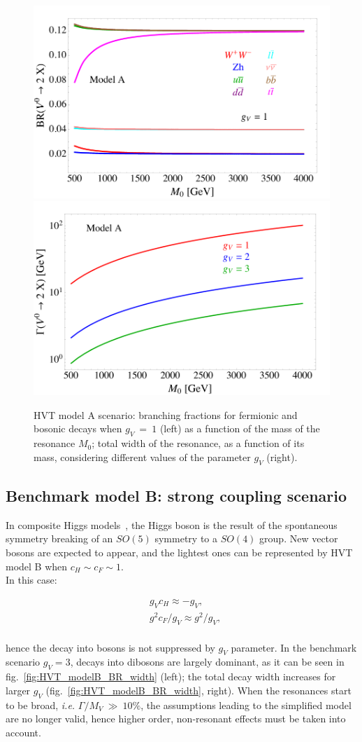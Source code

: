 \begin{figure}[!htb]
  \centering
    \includegraphics[width=.495\textwidth]{figures/Figures_BRWC.png}%
    \includegraphics[width=.495\textwidth]{figures/Figures_WidthWC.png}
  \caption{HVT model A scenario: branching fractions for fermionic and bosonic decays when $g_V~=~1$ (left) as a function of the mass of the resonance $M_0$; total width of the resonance, as a function of its mass, considering different values of the parameter $g_V$ (right).}
  \label{fig:HVT_modelA_BR_width}
\end{figure}

\subsection{Benchmark model B: strong coupling scenario}
\label{sec:theory_HVT_B}
In composite Higgs models~\cite{Contino2011}, the Higgs boson is the result of the spontaneous symmetry breaking of an $SO(5)$ symmetry to a $SO(4)$ group. New vector bosons are expected to appear, and the lightest ones can be represented by HVT model B when $c_H \sim c_F \sim 1$.\\ 
In this case:

\begin{equation}
\begin{split}
 & g_V c_H \approx -g_V,\\
 & g^2 c_F/g_V \approx g^2/g_V,\\
\end{split}
\label{eq:theory_HVT_modelB}
\end{equation}

\noindent hence the decay into bosons is not suppressed by $g_V$ parameter. In the benchmark scenario $g_V=3$, decays into dibosons are largely dominant, as it can be seen in fig.~\ref{fig:HVT_modelB_BR_width} (left); the total decay width increases for larger $g_V$ (fig.~\ref{fig:HVT_modelB_BR_width}, right). When the resonances start to be broad, \textit{i.e.} $\Gamma/M_V~\gg~10\%$, the assumptions leading to the simplified model are no longer valid, hence higher order, non-resonant effects must be taken into account.

